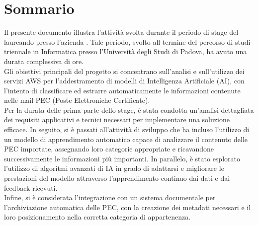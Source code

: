 \cleardoublepage
{}
{}
\begingroup
\let\clearpage\relax
\let\cleardoublepage\relax

\chapter*{Sommario}

Il presente documento illustra l'attività svolta durante il periodo di stage del laureando \myName presso l'azienda \myCompany. Tale periodo, svolto all termine del percorso di studi triennale in Informatica presso l'Università degli Studi di Padova, ha avuto una durata complessiva di \myHours ore. \\
Gli obiettivi principali del progetto si concentrano sull'analisi e sull'utilizzo dei servizi AWS per l'addestramento di modelli di Intelligenza Artificiale (AI), con l'intento di classificare ed estrarre automaticamente le informazioni contenute nelle mail PEC (Poste Elettroniche Certificate). \\
Per la durata delle prima parte dello stage, è stata condotta un'analisi dettagliata dei requisiti applicativi e tecnici necessari per implementare una soluzione efficace. In seguito, si è passati all'attività di sviluppo che ha incluso l'utilizzo di un modello di apprendimento automatico capace di analizzare il contenuto delle PEC importate, assegnando loro categorie appropriate e ricavandone successivamente le informazioni più importanti. In parallelo, è stato esplorato l'utilizzo di algoritmi avanzati di IA in grado di adattarsi e migliorare le prestazioni del modello attraverso l'apprendimento continuo dai dati e dai feedback ricevuti. \\
Infine, si è considerata l'integrazione con un sistema documentale per l'archiviazione automatica delle PEC, con la creazione dei metadati necessari e il loro posizionamento nella corretta categoria di appartenenza.\\

\endgroup
\vfill
